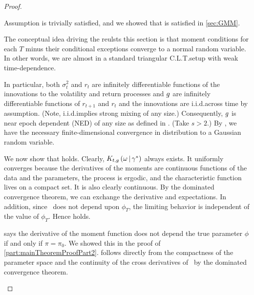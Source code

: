 \documentclass[11pt, letterpaper, twoside, final]{article}
\begin{document}
\begin{appendices}
\begin{proof}
\begin{proofpart}
\end{proofpart}

\begin{proofpart}
    \label{part:mainTheoremProofPart3}

    Assumption  is trivially satisfied,  and we showed that  is satisfied
    in \cref{sec:GMM}.  
        
    The conceptual idea driving the reulsts this section is that moment conditions for each $T$ minus their
    conditional exceptions converge to a normal random variable.
    In other words, we are almost in a standard triangular C.L.T.\@ setup with weak time-dependence.

    In particular, both $\sigma^2_t$ and $r_t$ are infinitely differentiable functions of the innovations to
    the volatility and return processes and $g$ are infinitely differentiable functions of $r_{t+1}$ and
    $r_t$ and the innovations are i.i.d.\@ across time by assumption.
    (Note, i.i.d.\@ implies strong mixing of any size.)
    Consequently, $g$ is near epoch dependent (NED) of any size as defined in
    \textcite{andrews1991empirical}.  
    (Take $s>2.$) 
    By \textcite[Theorem 3]{andrews1991empirical}, we have the necessary finite-dimensional convergence in
    distribution to a Gaussian random variable. 

    We now show that  holds.
    Clearly, $K_{t,g}\left(\omega \,\middle\vert\, \gamma^{*}\right)$ always exists.
    It uniformly converges because the derivatives of the moments are continuous functions of the data and the
    parameters, the process is ergodic, and the characteristic function lives on a compact set.
    It is also clearly continuous.
    By the dominated convergence theorem, we can exchange the derivative and expectations.
    In addition, since \popmom\ does not depend upon $\phi_T$, the limiting behavior is independent of the value
    of $\phi_T$.
    Hence  holds.
    
     says the derivative of the moment function does not depend the true parameter $\phi$ if
    and only if  $\pi =  \pi_0$. 
    We showed this in the proof of \cref{part:mainTheoremProofPart2}.
     follows directly from the compactness of the parameter space and the continuity of the
    cross derivatives of \popmom\ by the dominated convergence theorem.

\end{proofpart}


\end{proof}
\end{appendices}
\end{document}
